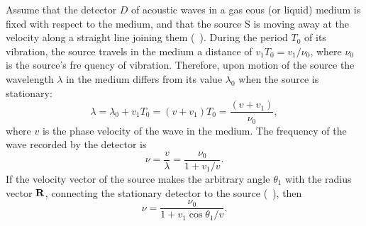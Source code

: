 Assume that the detector $D$ of acoustic waves in a gas­ eous (or liquid) medium is fixed with respect to the medium, and that the source S is moving away at the velocity along a straight line joining them (~). During the period $T_{0}$ of its vibration, the source travels in the medium a
distance of $v_{1}T_{0} = v_{1}/\nu_{0}$, where $\nu_{0}$ is the source's fre­ quency of vibration. Therefore, upon motion of the source the wavelength $\lambda$ in the medium differs from its value $\lambda_{0}$ when the source is stationary:
\begin{equation*}%
\lambda = \lambda_{0} + v_{1} T_{0} = ( v + v_{1} ) T_{0} =\frac{( v + v_{1} )}{\nu_{0}},
\end{equation*} 
where $v$ is the phase velocity of the wave in the medium. The frequency of the wave recorded by the detector is
\begin{equation*}%
\nu = \frac{v}{\lambda}  = \frac{\nu_{0}}{1 + v_{1}/v}.
\end{equation*}
If the velocity vector of the source makes the arbitrary angle 
$\theta_{1}$ with the radius vector $\vb{R}$, connecting the stationary detector to the source (~), then
\begin{equation*}%
\nu = \frac{\nu_{0}}{1 + v_{1} \cos \theta_{1}/v}.
\end{equation*}

